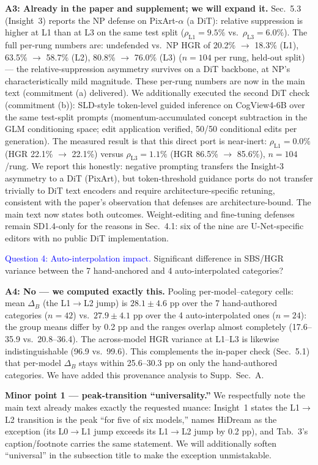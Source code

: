 \textbf{A3: Already in the paper and supplement; we will expand it.}
Sec.~5.3 (Insight~3) reports the NP defense on PixArt-$\alpha$ (a DiT): relative suppression is higher at L1 than at L3 on the same test split ($\rho_{\mathrm{L1}} = 9.5\%$ vs.\ $\rho_{\mathrm{L3}} = 6.0\%$). The full per-rung numbers are: undefended vs.\ NP HGR of 20.2\% $\to$ 18.3\% (L1), 63.5\% $\to$ 58.7\% (L2), 80.8\% $\to$ 76.0\% (L3) ($n = 104$ per rung, held-out split) --- the relative-suppression asymmetry survives on a DiT backbone, at NP's characteristically mild magnitude. These per-rung numbers are now in the main text (commitment (a) delivered).
We additionally executed the second DiT check (commitment (b)): SLD-style token-level guided inference on CogView4-6B over the same test-split prompts (momentum-accumulated concept subtraction in the GLM conditioning space; edit application verified, 50/50 conditional edits per generation). The measured result is that this direct port is near-inert: $\rho_{\mathrm{L1}} = 0.0\%$ (HGR 22.1\% $\to$ 22.1\%) versus $\rho_{\mathrm{L3}} = 1.1\%$ (HGR 86.5\% $\to$ 85.6\%), $n = 104$/rung. We report this honestly: negative prompting transfers the Insight-3 asymmetry to a DiT (PixArt), but token-threshold guidance ports do not transfer trivially to DiT text encoders and require architecture-specific retuning, consistent with the paper's observation that defenses are architecture-bound. The main text now states both outcomes.
Weight-editing and fine-tuning defenses remain SD1.4-only for the reasons in Sec.~4.1: six of the nine are U-Net-specific editors with no public DiT implementation.

\textcolor{blue}{Question 4: Auto-interpolation impact.} Significant difference in SBS/HGR variance between the 7 hand-anchored and 4 auto-interpolated categories?

\textbf{A4: No --- we computed exactly this.}
Pooling per-model--category cells: mean $\Delta_B$ (the L1$\to$L2 jump) is $28.1 \pm 4.6$ pp over the 7 hand-authored categories ($n = 42$) vs.\ $27.9 \pm 4.1$ pp over the 4 auto-interpolated ones ($n = 24$): the group means differ by 0.2 pp and the ranges overlap almost completely (17.6--35.9 vs.\ 20.8--36.4). The across-model HGR variance at L1--L3 is likewise indistinguishable (96.9 vs.\ 99.6). This complements the in-paper check (Sec.~5.1) that per-model $\Delta_B$ stays within 25.6--30.3 pp on only the hand-authored categories. We have added this provenance analysis to Supp.~Sec.~A.

\textbf{Minor point 1 --- peak-transition ``universality.''} We respectfully note the main text already makes exactly the requested nuance: Insight~1 states the L1$\to$L2 transition is the peak ``for five of six models,'' names HiDream as the exception (its L0$\to$L1 jump exceeds its L1$\to$L2 jump by 0.2 pp), and Tab.~3's caption/footnote carries the same statement. We will additionally soften ``universal'' in the subsection title to make the exception unmistakable.

